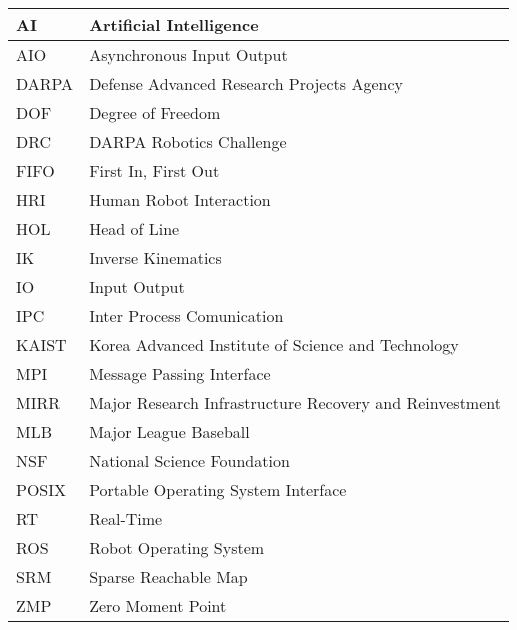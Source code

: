 \begin{tabular}{l | l}
\hline
AI & Artificial Intelligence\\
\hline
AIO & Asynchronous Input Output\\
\hline
DARPA  &  Defense Advanced Research Projects Agency\\
\hline 
DOF & Degree of Freedom \\
\hline
DRC  & DARPA Robotics Challenge \\
\hline
FIFO & First In, First Out\\
\hline
HRI & Human Robot Interaction\\
\hline
HOL & Head of Line\\
\hline
IK & Inverse Kinematics\\ 
\hline
IO & Input Output\\
\hline
IPC & Inter Process Comunication \\
\hline
KAIST & Korea Advanced Institute of Science and Technology \\
\hline
MPI & Message Passing Interface\\
\hline
MIRR & Major Research Infrastructure Recovery and Reinvestment\\
\hline
MLB & Major League Baseball\\
\hline
NSF & National Science Foundation \\
\hline
POSIX & Portable Operating System Interface\\
\hline
RT & Real-Time\\
\hline
ROS & Robot Operating System\\
\hline
SRM & Sparse Reachable Map \\
\hline 
ZMP & Zero Moment Point\\
\hline
\end{tabular}

